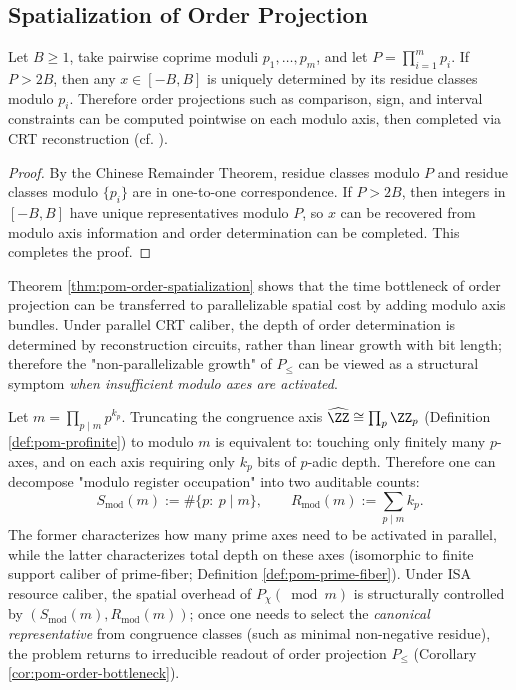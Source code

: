 \subsection{Spatialization of Order Projection}\label{subsec:pom-order-spatialization}
\begin{theorem}\label{thm:pom-order-spatialization}
Let $B\ge 1$, take pairwise coprime moduli $p_1,\dots,p_m$, and let $P=\prod_{i=1}^m p_i$. If $P>2B$, then any $x\in[-B,B]$ is uniquely determined by its residue classes modulo $p_i$. Therefore order projections such as comparison, sign, and interval constraints can be computed pointwise on each modulo axis, then completed via CRT reconstruction (cf. \cite{Apostol1976}).
\end{theorem}
\begin{proof}
By the Chinese Remainder Theorem, residue classes modulo $P$ and residue classes modulo $\{p_i\}$ are in one-to-one correspondence. If $P>2B$, then integers in $[-B,B]$ have unique representatives modulo $P$, so $x$ can be recovered from modulo axis information and order determination can be completed. This completes the proof.
\end{proof}

\begin{remark}
Theorem \ref{thm:pom-order-spatialization} shows that the time bottleneck of order projection can be transferred to parallelizable spatial cost by adding modulo axis bundles. Under parallel CRT caliber, the depth of order determination is determined by reconstruction circuits, rather than linear growth with bit length; therefore the "non-parallelizable growth" of $P_{\le}$ can be viewed as a structural symptom \emph{when insufficient modulo axes are activated}.
\end{remark}

\begin{remark}\label{rem:pom-mod-support-count}
Let \(m=\prod_{p\mid m}p^{k_p}\).
Truncating the congruence axis \(\widehat{\ZZ}\cong\prod_p\ZZ_p\) (Definition \ref{def:pom-profinite}) to modulo \(m\) is equivalent to: touching only finitely many \(p\)-axes, and on each axis requiring only \(k_p\) bits of \(p\)-adic depth.
Therefore one can decompose "modulo register occupation" into two auditable counts:
\[
S_{\mathrm{mod}}(m):=\#\{p:\ p\mid m\},\qquad
R_{\mathrm{mod}}(m):=\sum_{p\mid m}k_p.
\]
The former characterizes how many prime axes need to be activated in parallel, while the latter characterizes total depth on these axes (isomorphic to finite support caliber of prime-fiber; Definition \ref{def:pom-prime-fiber}).
Under ISA resource caliber, the spatial overhead of \(P_\chi(\bmod m)\) is structurally controlled by \((S_{\mathrm{mod}}(m),R_{\mathrm{mod}}(m))\);
once one needs to select the \emph{canonical representative} from congruence classes (such as minimal non-negative residue), the problem returns to irreducible readout of order projection \(P_{\le}\) (Corollary \ref{cor:pom-order-bottleneck}).
\end{remark}


